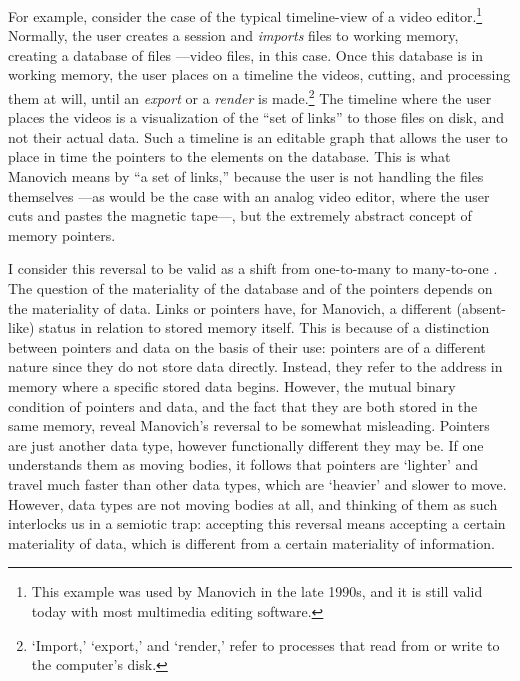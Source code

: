 
For example, consider the case of the typical timeline-view of a video editor.\footnote{This example was used by Manovich in the late 1990s, and it is still valid today with most multimedia editing software.} Normally, the user creates a session and \textit{imports} files to working memory, creating a database of files ---video files, in this case. Once this database is in working memory, the user places on a timeline the videos, cutting, and processing them at will, until an \textit{export} or a \textit{render} is made.\footnote{`Import,' `export,' and `render,' refer to processes that read from or write to the computer's disk.} The timeline where the user places the videos is a visualization of the ``set of links'' to those files on disk, and not their actual data. Such a timeline is an editable graph that allows the user to place in time the pointers to the elements on the database. This is what Manovich means by ``a set of links,'' because the user is not handling the files themselves ---as would be the case with an analog video editor, where the user cuts and pastes the magnetic tape---, but the extremely abstract concept of memory pointers. 

I consider this reversal to be valid as a shift from one-to-many to many-to-one . The question of the materiality of the database and of the pointers depends on the materiality of data. Links or pointers have, for Manovich, a different (absent-like) status in relation to stored memory itself. This is because of a distinction between pointers and data on the basis of their use: pointers are of a different nature since they do not store data directly. Instead, they refer to the address in memory where a specific stored data begins. However, the mutual binary condition of pointers and data, and the fact that they are both stored in the same memory, reveal Manovich's reversal to be somewhat misleading. Pointers are just another data type, however functionally different they may be. If one understands them as moving bodies, it follows that pointers are `lighter' and travel much faster than other data types, which are `heavier' and slower to move. However, data types are not moving bodies at all, and thinking of them as such interlocks us in a semiotic trap: accepting this reversal means accepting a certain materiality of data, which is different from a certain materiality of information.